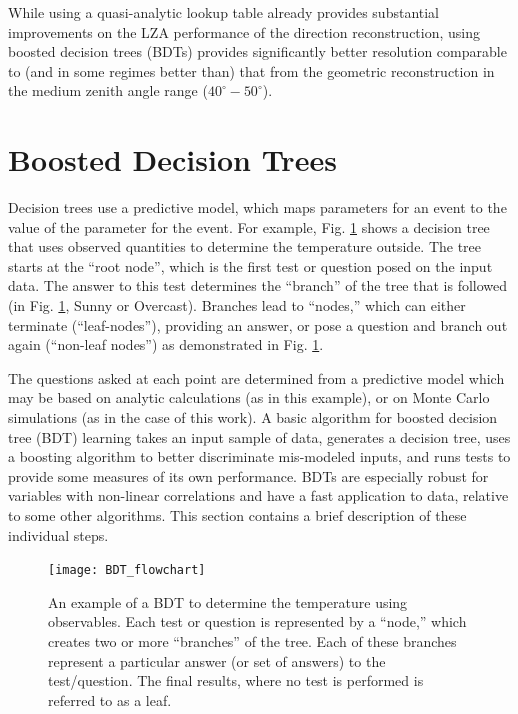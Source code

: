\documentclass[main.tex]{subfiles}
\begin{document}
While using a quasi-analytic lookup table already provides substantial improvements on the LZA performance of the direction reconstruction, using boosted decision trees (BDTs) provides significantly better resolution comparable to (and in some regimes better than) that from the geometric reconstruction in the medium zenith angle range ($40^\circ-50^\circ$).

\section{Boosted Decision Trees}
Decision trees use a predictive model, which maps parameters for an event to the value of the \disp parameter for the event. For example, Fig. \ref{fig:BDT_flowchart} shows a decision tree that uses observed quantities to determine the temperature outside. The tree starts at the ``root node'', which is the first test or question posed on the input data. The answer to this test determines the ``branch'' of the tree that is followed (in Fig. \ref{fig:BDT_flowchart}, Sunny or Overcast). Branches lead to ``nodes,'' which can either terminate (``leaf-nodes''), providing an answer, or pose a question and branch out again (``non-leaf nodes'') as demonstrated in Fig. \ref{fig:BDT_flowchart}.

The questions asked at each point are determined from a predictive model which may be based on analytic calculations (as in this example), or on Monte Carlo simulations (as in the case of this work). A basic algorithm for boosted decision tree (BDT) learning takes an input sample of data, generates a decision tree, uses a boosting algorithm to better discriminate mis-modeled inputs, and runs tests to provide some measures of its own performance. BDTs are especially robust for variables with non-linear correlations and have a fast application to data, relative to some other algorithms. This section contains a brief description of these individual steps.
\begin{figure}[htbp]
  \centering
  \texttt{[image: BDT\_flowchart]}
  \caption[An example of a BDT]{An example of a BDT to determine the temperature using observables. Each test or question is represented by a ``node,'' which creates two or more ``branches'' of the tree. Each of these branches represent a particular answer (or set of answers) to the test/question. The final results, where no test is performed is referred to as a leaf.}
  \label{fig:BDT_flowchart}
\end{figure}
\end{document}
